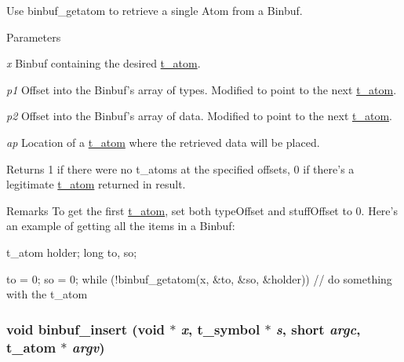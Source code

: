 Use binbuf\_\-getatom to retrieve a single Atom from a Binbuf. 
\begin{DoxyParams}{Parameters}
\item[{\em x}]Binbuf containing the desired \hyperlink{structt__atom}{t\_\-atom}. \item[{\em p1}]Offset into the Binbuf’s array of types. Modified to point to the next \hyperlink{structt__atom}{t\_\-atom}. \item[{\em p2}]Offset into the Binbuf’s array of data. Modified to point to the next \hyperlink{structt__atom}{t\_\-atom}. \item[{\em ap}]Location of a \hyperlink{structt__atom}{t\_\-atom} where the retrieved data will be placed.\end{DoxyParams}
\begin{DoxyReturn}{Returns}
1 if there were no t\_\-atoms at the specified offsets, 0 if there’s a legitimate \hyperlink{structt__atom}{t\_\-atom} returned in result.
\end{DoxyReturn}
\begin{DoxyRemark}{Remarks}
To get the first \hyperlink{structt__atom}{t\_\-atom}, set both typeOffset and stuffOffset to 0. Here’s an example of getting all the items in a Binbuf: 
\begin{DoxyCode}
    t_atom holder; 
    long to, so; 
    
    to = 0; 
    so = 0; 
    while (!binbuf_getatom(x, &to, &so, &holder)){
        // do something with the t_atom
    }
\end{DoxyCode}
 
\end{DoxyRemark}
\hypertarget{group__binbuf_gad8f2272c95a8e89f22f1a9c67272af5e}{
\subsubsection[{binbuf\_\-insert}]{\setlength{\rightskip}{0pt plus 5cm}void binbuf\_\-insert (void $\ast$ {\em x}, \/  {\bf t\_\-symbol} $\ast$ {\em s}, \/  short {\em argc}, \/  {\bf t\_\-atom} $\ast$ {\em argv})}}
\label{group__binbuf_gad8f2272c95a8e89f22f1a9c67272af5e}


